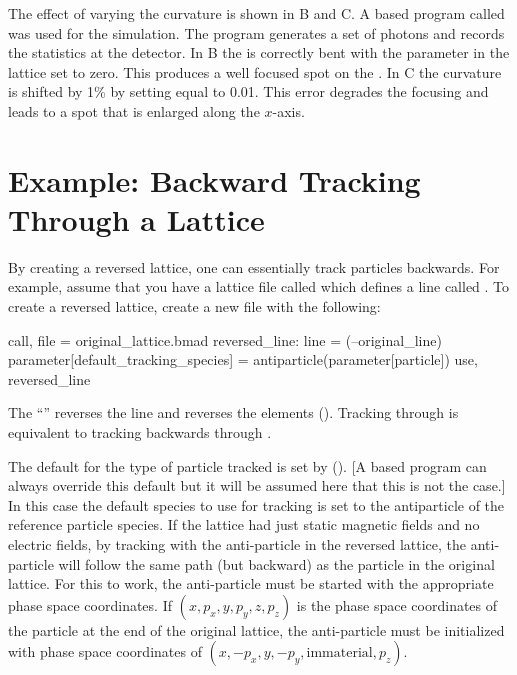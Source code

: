 The effect of varying the  curvature is shown in B and
C. A \bmad based program called  was used for the simulation. The 
program generates a set of photons and records the statistics at the detector. In B
the  is correctly bent with the parameter  in the lattice set to zero. This
produces a well focused spot on the . In C the  curvature
is shifted by 1\% by setting  equal to 0.01. This error degrades the focusing and leads to a
spot that is enlarged along the $x$-axis.


\section{Example: Backward Tracking Through a Lattice}
\label{s:reverse}

By creating a reversed lattice, one can essentially track particles backwards. For example,
assume that you have a lattice file called  which defines a line
called . To create a reversed lattice, create a new file with the following:
\begin{example}
  call, file = original_lattice.bmad
  reversed_line: line = (--original_line)
  parameter[default_tracking_species] = antiparticle(parameter[particle])
  use, reversed_line
\end{example}
The ``\vn{-{}-}'' reverses the line and reverses the elements (). Tracking through
 is equivalent to tracking backwards through .  

The default for the type of particle tracked is set by 
(). [A \bmad based program can always override this default but it will be assumed
here that this is not the case.] In this case the default species to use for tracking is set to the
antiparticle of the reference particle species. If the  lattice had just static
magnetic fields and no electric fields, by tracking with the anti-particle in the reversed lattice,
the anti-particle will follow the same path (but backward) as the particle in the original
lattice. For this to work, the anti-particle must be started with the appropriate phase space
coordinates. If $(x, p_x, y, p_y, z, p_z)$ is the phase space coordinates of the particle at the end
of the original lattice, the anti-particle must be initialized with phase space coordinates of $(x,
-p_x, y, -p_y, \text{immaterial}, p_z)$.
